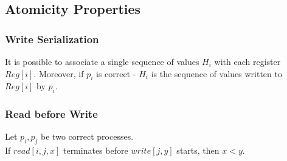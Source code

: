 \subsection{Atomicity Properties}
\begin{frame}
    \frametitle{Write Serialization}
    \begin{lemma}
        It is possible to associate a single sequence of values $H_i$
        with each register $Reg[i]$. Moreover, if $p_i$ is correct -
        $H_i$ is the sequence of values written to $Reg[i]$ by $p_i$.
    \end{lemma}
\end{frame}
\begin{frame}
    \frametitle{Read before Write}
    \begin{lemma}
        Let $p_i, p_j$ be two correct processes.\\
        If $read[i,j,x]$ terminates before $write[j,y]$ starts, then $x<y$.
    \end{lemma}
\end{frame}
